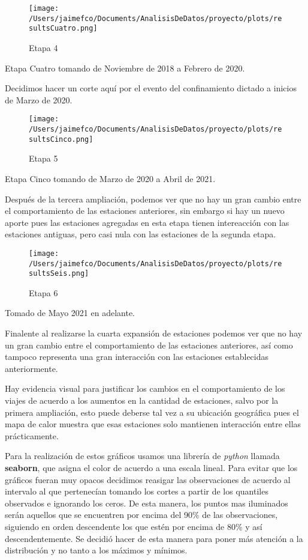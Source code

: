 \documentclass[
]{article}
\begin{document}
\begin{figure}
\centering
\texttt{[image: /Users/jaimefco/Documents/AnalisisDeDatos/proyecto/plots/resultsCuatro.png]}
\caption{Etapa 4}
\end{figure}

Etapa Cuatro tomando de Noviembre de 2018 a Febrero de 2020.

Decidimos hacer un corte aquí por el evento del confinamiento dictado a
inicios de Marzo de 2020.

\begin{figure}
\centering
\texttt{[image: /Users/jaimefco/Documents/AnalisisDeDatos/proyecto/plots/resultsCinco.png]}
\caption{Etapa 5}
\end{figure}

Etapa Cinco tomando de Marzo de 2020 a Abril de 2021.

Después de la tercera ampliación, podemos ver que no hay un gran cambio
entre el comportamiento de las estaciones anteriores, sin embargo si hay
un nuevo aporte pues las estaciones agregadas en esta etapa tienen
intereacción con las estaciones antiguas, pero casi nula con las
estaciones de la segunda etapa.

\begin{figure}
\centering
\texttt{[image: /Users/jaimefco/Documents/AnalisisDeDatos/proyecto/plots/resultsSeis.png]}
\caption{Etapa 6}
\end{figure}

Tomado de Mayo 2021 en adelante.

Finalente al realizarse la cuarta expansión de estaciones podemos ver
que no hay un gran cambio entre el comportamiento de las estaciones
anteriores, así como tampoco representa una gran interacción con las
estaciones establecidas anteriormente.

Hay evidencia visual para justificar los cambios en el comportamiento de
los viajes de acuerdo a los aumentos en la cantidad de estaciones, salvo
por la primera ampliación, esto puede deberse tal vez a su ubicación
geográfica pues el mapa de calor muestra que esas estaciones solo
mantienen interacción entre ellas prácticamente.

Para la realización de estos gráficos usamos una librería de
\emph{python} llamada \textbf{seaborn}, que asigna el color de acuerdo a
una escala lineal. Para evitar que los gráficos fueran muy opacos
decidimos reasigar las observaciones de acuerdo al intervalo al que
pertenecían tomando los cortes a partir de los quantiles observados e
ignorando los ceros. De esta manera, los puntos mas iluminados serán
aquellos que se encuentren por encima del 90\% de las observaciones,
siguiendo en orden descendente los que estén por encima de 80\% y así
descendentemente. Se decidió hacer de esta manera para poner más
atención a la distribución y no tanto a los máximos y mínimos.
\end{document}
